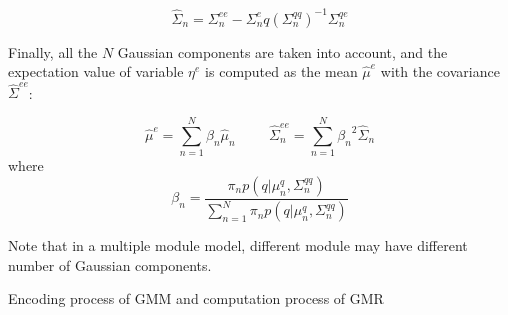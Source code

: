 \begin{table}
{\begin{minipage}[t]{0.45\textwidth}
            \begin{equation}
            {
            \hat{\Sigma}_{n} = {\Sigma}_{n}^{ee} - {\Sigma}_{n}^eq({\Sigma}_{n}^{qq})^{-1}{\Sigma}_{n}^{qe}
            }
            \end{equation}


            Finally, all the $N$ Gaussian components are taken into account, and the expectation value of variable $\eta^e$ is computed as the mean $\hat{\mu}^e$ with the covariance $\hat{\Sigma}^{ee}$:

            \begin{equation}
            {
            \hat{\mu}^{e} = \sum_{n=1}^N{\beta_n}\hat{\mu}_{n}
            }
            \hspace{1cm}
            {
            \hat{\Sigma}_{n}^{ee} = \sum_{n=1}^N{\beta_n}^2\hat{\Sigma}_{n}
            }
            \end{equation}
            where
            \begin{equation}
            {
            \beta_n = \frac{\pi_{n}p(q|{\mu}_{n}^q,{\Sigma}_{n}^{qq})}
            {\sum_{n=1}^N{\pi_n}p(q|{\mu}_{n}^q,{\Sigma}_{n}^{qq})}
            }
            \end{equation}

            Note that in a multiple module model, different module may have different number of Gaussian components.
        \end{minipage}
    }
\caption{Encoding process of GMM and computation process of GMR}
\label{tab:GMM}
\end{table}



